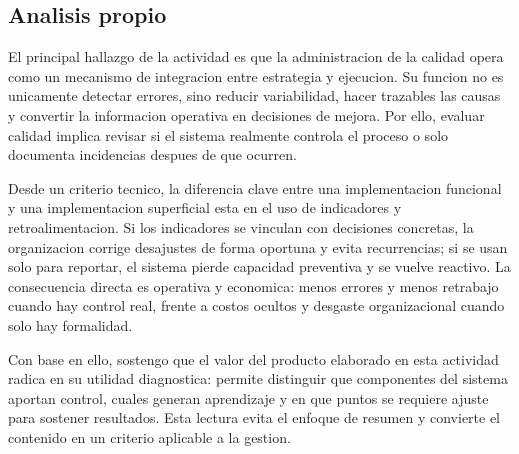 \documentclass[
	spanish,
	letterpaper, oneside
]{article}
\begin{document}
%

\subsection{Analisis propio}

El principal hallazgo de la actividad es que la administracion de la calidad opera como un mecanismo de integracion entre estrategia y ejecucion. Su funcion no es unicamente detectar errores, sino reducir variabilidad, hacer trazables las causas y convertir la informacion operativa en decisiones de mejora. Por ello, evaluar calidad implica revisar si el sistema realmente controla el proceso o solo documenta incidencias despues de que ocurren.

Desde un criterio tecnico, la diferencia clave entre una implementacion funcional y una implementacion superficial esta en el uso de indicadores y retroalimentacion. Si los indicadores se vinculan con decisiones concretas, la organizacion corrige desajustes de forma oportuna y evita recurrencias; si se usan solo para reportar, el sistema pierde capacidad preventiva y se vuelve reactivo. La consecuencia directa es operativa y economica: menos errores y menos retrabajo cuando hay control real, frente a costos ocultos y desgaste organizacional cuando solo hay formalidad.

Con base en ello, sostengo que el valor del producto elaborado en esta actividad radica en su utilidad diagnostica: permite distinguir que componentes del sistema aportan control, cuales generan aprendizaje y en que puntos se requiere ajuste para sostener resultados. Esta lectura evita el enfoque de resumen y convierte el contenido en un criterio aplicable a la gestion.
\end{document}
